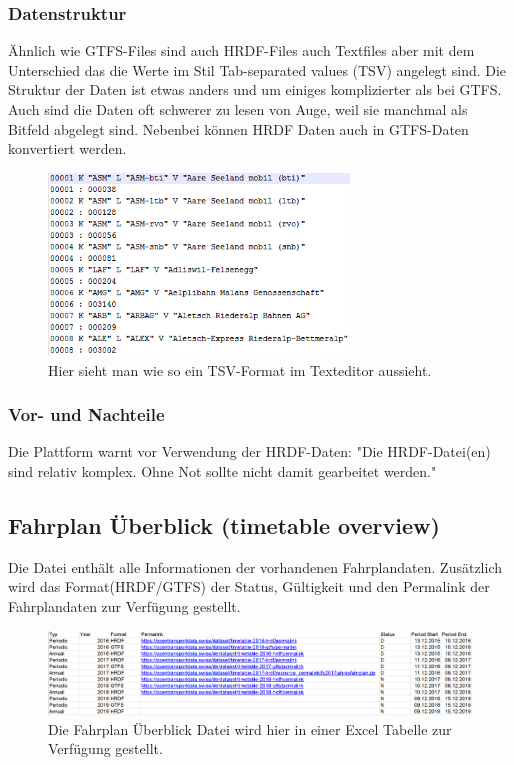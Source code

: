 \subsubsection{Datenstruktur}
\label{sec:hrdf-datenstrukur}
Ähnlich wie GTFS-Files sind auch HRDF-Files auch Textfiles aber mit dem Unterschied das die Werte im Stil Tab-separated values (TSV) angelegt sind. Die Struktur der Daten ist etwas anders und um einiges komplizierter als bei GTFS. Auch sind die Daten oft schwerer zu lesen von Auge, weil sie manchmal als Bitfeld abgelegt sind. Nebenbei können HRDF Daten auch in GTFS-Daten konvertiert werden.\cite{hrdfintogtfs}
\begin{figure}[]
	\centering
	\includegraphics[width=8cm]{img/bsptsv.png}
	\caption{Hier sieht man wie so ein TSV-Format im Texteditor aussieht.}
	\label{fig:hrdf-dateiformat}
\end{figure}


\subsubsection{Vor- und Nachteile}	
\label{sec:hrdf-vornachteile}
Die Plattform warnt vor Verwendung der HRDF-Daten: "Die HRDF-Datei(en) sind relativ komplex. Ohne Not sollte nicht damit gearbeitet werden."\cite{opentransporthrdf}

\subsection{Fahrplan Überblick (timetable overview)}
\label{sec:Fahrplan Ueberblick}
Die Datei enthält alle Informationen der vorhandenen Fahrplandaten. Zusätzlich wird das Format(HRDF/GTFS) der Status, Gültigkeit und den Permalink der Fahrplandaten zur Verfügung gestellt.

\begin{figure}[]
	\centering
	\includegraphics[width=12cm]{img/fahrplanueberblick.png}
	\caption{Die Fahrplan Überblick Datei wird hier in einer Excel Tabelle zur Verfügung gestellt.}
	\label{fig:Fahrplan Ueberblick dateiformat}
\end{figure}


